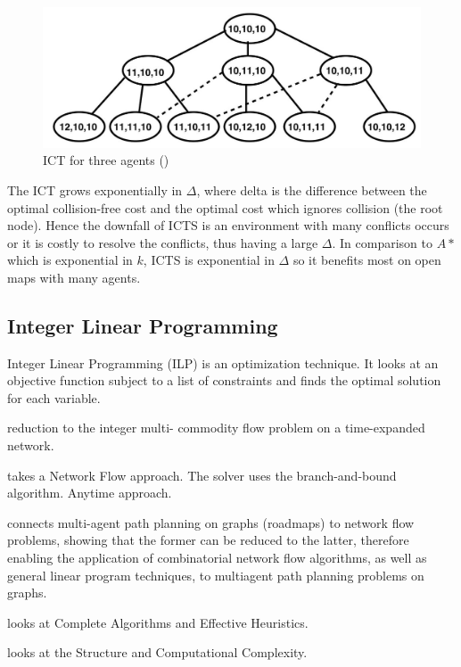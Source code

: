 \documentclass[a4paper,11pt]{article}
\begin{document}
\begin{figure}[!htb]
	\centering
	\centering
	\includegraphics[width=0.9\linewidth]{graphics/ictstree}
	\caption{ICT for three agents (\cite{sharon2011increasing})}
	\label{fig:increasingcosttree}
\end{figure}

The ICT grows exponentially in $\Delta$, where delta is the difference between the optimal collision-free cost and the optimal cost which ignores collision (the root node). Hence the downfall of ICTS is an environment with many conflicts occurs or it is costly to resolve the conflicts, thus having a large $\Delta$. In comparison to $A*$ which is exponential in $k$, ICTS is exponential in $\Delta$ so it benefits most on open maps with many agents.

\subsection{Integer Linear Programming}
Integer Linear Programming (ILP) is an optimization technique. It looks at an objective function subject to a list of constraints and finds the optimal solution for each variable.

\cite{ma2016optimal} reduction to the integer multi- commodity flow problem on a time-expanded network.

\cite{yu2016optimal} takes a Network Flow approach. The solver uses the branch-and-bound algorithm. Anytime approach.


\cite{yu2013multi} connects multi-agent path planning on graphs (roadmaps) to network flow problems, showing that the former can be reduced to the latter, therefore enabling the application of combinatorial network flow algorithms, as well as general linear program techniques, to multiagent path planning problems on graphs.

\cite{yu2016optimal} looks at Complete Algorithms and Effective Heuristics.

\cite{yu2015optimal} looks at the Structure and Computational Complexity.
\end{document}
